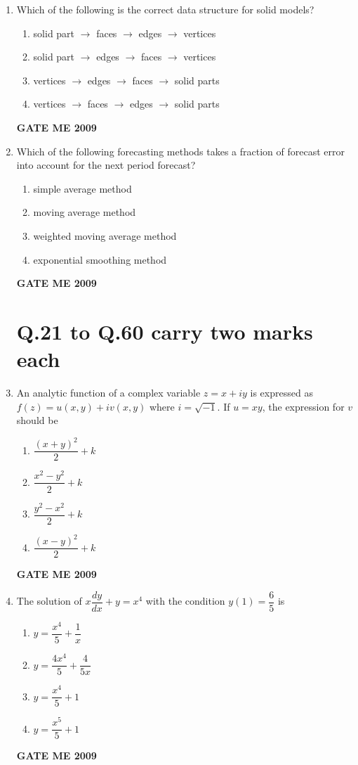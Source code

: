 \documentclass[journal]{IEEEtran}
\begin{document}
\begin{enumerate}[leftmargin=0pt]
\item Which of the following is the correct data structure for solid models?
  \begin{enumerate}[label=(\alph*)]
    \item solid part $\to$ faces $\to$ edges $\to$ vertices
    \item solid part $\to$ edges $\to$ faces $\to$ vertices
    \item vertices $\to$ edges $\to$ faces $\to$ solid parts
    \item vertices $\to$ faces $\to$ edges $\to$ solid parts
  \end{enumerate}
  \hfill{\textbf{GATE ME 2009}}



\item Which of the following forecasting methods takes a fraction of forecast error into account for the next period forecast?
  \begin{enumerate}[label=(\alph*)]
    \item simple average method
    \item moving average method
    \item weighted moving average method
    \item exponential smoothing method
  \end{enumerate}
  \hfill{\textbf{GATE ME 2009}}
\section*{\textbf{Q.21 to Q.60 carry two marks each}} 





\item An analytic function of a complex variable $z = x + iy$ is expressed as $f(z) = u(x,y) + iv(x,y)$ where $i = \sqrt{-1}$. If $u = xy$, the expression for $v$ should be
\begin{enumerate}[label=(\Alph*)]
  \item $\dfrac{(x+y)^2}{2} + k$
  \item $\dfrac{x^2 - y^2}{2} + k$
  \item $\dfrac{y^2 - x^2}{2} + k$
  \item $\dfrac{(x-y)^2}{2} + k$
\end{enumerate}
\hfill{\textbf{GATE ME 2009}}



\item The solution of $x \dfrac{dy}{dx} + y = x^4$ with the condition $y(1) = \dfrac{6}{5}$ is
\begin{enumerate}[label=(\Alph*)]
  \item $y = \dfrac{x^4}{5} + \dfrac{1}{x}$
  \item $y = \dfrac{4x^4}{5} + \dfrac{4}{5x}$
  \item $y = \dfrac{x^4}{5} + 1$
  \item $y = \dfrac{x^5}{5} + 1$
\end{enumerate}
\hfill{\textbf{GATE ME 2009}}





\end{enumerate}
\end{document}
